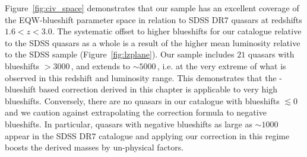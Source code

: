 Figure~\ref{fig:civ_space} demonstrates that our sample has an excellent coverage of the  EQW-blueshift parameter space in relation to SDSS DR$7$ quasars at redshifts $1.6 < z < 3.0$. 
The systematic offset to higher  blueshifts for our catalogue relative to the SDSS quasars as a whole is a result of the higher mean luminosity relative to the SDSS sample (Figure~\ref{fig:lzplane}).
Our sample includes $21$ quasars with  blueshifts $>3000$\,\kms, and extends to $\sim5000$\,\kms, i.e. at the very extreme of what is observed in this redshift and luminosity range. 
This demonstrates that the -blueshift based correction derived in this chapter is applicable to very high blueshifts. 
Conversely, there are no quasars in our catalogue with  blueshifts $\lesssim0$\,\kms\, and we caution against extrapolating the correction formula to negative blueshifts.
In particular, quasars with negative blueshifts as large as $\sim1000$\,\kms\, appear in the SDSS DR$7$ catalogue and applying our correction in this regime boosts the derived masses by un-physical factors.    

